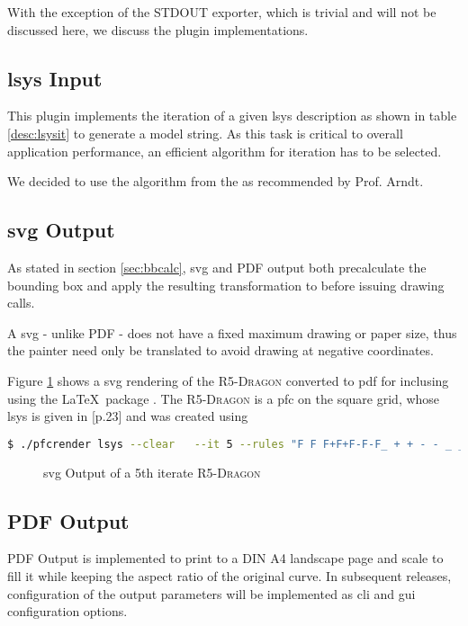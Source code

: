With the exception of the STDOUT exporter, which is trivial and will not be discussed here, we discuss the plugin implementations.

\subsection{\gls{lsys} Input}
\label{sec:lsys}

This plugin implements the iteration of a given \gls{lsys} description as shown in table \ref{desc:lsysit} to generate a model string.
As this task is critical to overall application performance, an efficient algorithm for iteration has to be selected. 

We decided to use the  algorithm from the  as recommended by Prof. Arndt.

\subsection{\gls{svg} Output}
\label{sec:svg}
As stated in section \ref{sec:bbcalc}, \gls{svg} and PDF output both precalculate the bounding box and apply the resulting transformation to  before issuing drawing calls.

A \gls{svg} - unlike PDF - does not have a fixed maximum drawing or paper size, thus the painter need only be translated to avoid drawing at negative coordinates.

Figure \ref{fig:plugsvg} shows a \gls{svg} rendering of the \textsc{R5-Dragon} converted to pdf for inclusing using the \LaTeX\ package . The \textsc{R5-Dragon} is a \gls{pfc} on the square grid, whose \gls{lsys} is given in \citet{Arndt2016}[p.23] and was created using 
\begin{lstlisting}[language=bash]
$ ./pfcrender lsys --clear   --it 5 --rules "F F F+F+F-F-F_ + + - - _ _ ~ ~" --sw 2 --sl 10 --rd 0.33 --batch svg --a 90
\end{lstlisting}

\begin{figure}
	
	\caption{\gls{svg} Output of a 5th iterate \textsc{R5-Dragon}}
	\label{fig:plugsvg}
\end{figure}
\subsection{PDF Output}
\label{sec:pdf}
PDF Output is implemented to print to a DIN A4 landscape page and scale to fill it while keeping the aspect ratio of the original curve.
In subsequent releases, configuration of the output parameters will be implemented as \gls{cli} and \gls{gui} configuration options.

